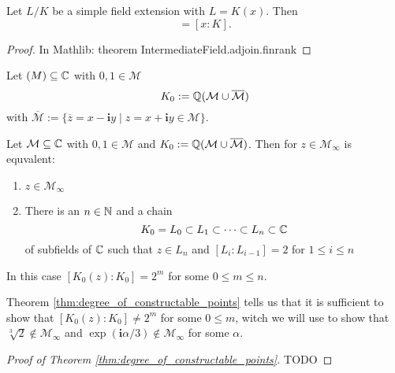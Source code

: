 \documentclass{../Proof_layout_PDF/TemplateExercise}
\begin{document}
\begin{theorem}
\label{thm:degree_of_simple_field_extension}
    Let $L/K$ be a simple field extension with $L = K(x)$. Then
    \begin{equation*}
        [L:K] = [x:K].
    \end{equation*}
\end{theorem}
\begin{proof}
    In Mathlib: theorem IntermediateField.adjoin.finrank
\end{proof}
\begin{definition}
    Let $\mathcal(M)\subseteq\mathbb{C}$ with $0,1 \in \mathcal{M}$
    \begin{equation*}
        K_0 := \mathbb{Q}(\mathcal{M}\cup \overline{\mathcal{M}})
    \end{equation*}
    with $\overline{\mathcal{M}} := \{ \overline{z} = x - \textbf{i}y \mid z = x+\textbf{i}y  \in \mathcal{M} \}$.
\end{definition}
\begin{theorem}
\label{thm:degree_of_constructable_points}
    Let $\mathcal{M}\subseteq\mathbb{C}$ with $0,1 \in \mathcal{M}$ and $K_0 := \mathbb{Q}(\mathcal{M}\cup \overline{\mathcal{M}})$.
    Then for $z \in \mathcal{M}_{\infty}$ is equvalent:
    \begin{enumerate}
        \item $z \in \mathcal{M}_{\infty}$
        \item There is an $n \in \mathbb{N}$ and a chain \begin{equation*}
            K_0 = L_0 \subset L_1 \subset \dots \subset L_n \subset \mathbb{C}
        \end{equation*}
        of subfields of $\mathbb{C}$ such that $z \in L_n$ and $[L_i:L_{i-1}] =2$ for $1\le i\le n$ %
    \end{enumerate}
    In this case $[K_0(z):K_0] = 2^m$ for some $0 \le m \le n$.
\end{theorem}
\begin{remark}
    Theorem \ref{thm:degree_of_constructable_points} tells us that it is sufficient to show that $[K_0(z):K_0] \ne 2^m$ for some $0 \le m $, witch we will use to show that $\sqrt[3]{2} \notin \mathcal{M}_{\infty}$ and $\exp(\textbf{i} \alpha/3) \notin \mathcal{M}_{\infty}$ for some $\alpha$.
\end{remark}
\begin{proof}[Proof of Theorem \ref{thm:degree_of_constructable_points}]
    TODO %
\end{proof}
\end{document}
